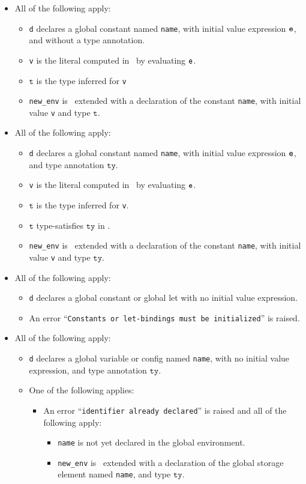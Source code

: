 \documentclass{book}
\newcommand\name[0]{\texttt{name}}
\newcommand\vt[0]{\texttt{t}}
\newcommand\tty[0]{\texttt{ty}}
\begin{document}
\begin{itemize}
  \item All of the following apply:
  \begin{itemize}
    \item \texttt{d} declares a global constant named \name, with initial value expression $\texttt{e}$, and without a type annotation.
    \item \texttt{v} is the literal computed in \tenv\ by evaluating $\texttt{e}$.
    \item $\vt$ is the type inferred for \texttt{v}
    \item \texttt{new\_env} is \tenv\ extended with a declaration of the constant \name, with initial value \texttt{v} and type $\vt$.
  \end{itemize}

  \item All of the following apply:
  \begin{itemize}
    \item \texttt{d} declares a global constant named \name, with initial value expression $\texttt{e}$, and type annotation $\tty$.
    \item \texttt{v} is the literal computed in \tenv\ by evaluating $\texttt{e}$.
    \item $\vt$ is the type inferred for \texttt{v}.
    \item $\vt$ type-satisfies $\tty$ in \tenv.
    \item \texttt{new\_env} is \tenv\ extended with a declaration of the constant \name, with initial value \texttt{v} and type $\tty$.
  \end{itemize}

  \item All of the following apply:
  \begin{itemize}
    \item \texttt{d} declares a global constant or global let with no initial value expression.
    \item An error ``\texttt{Constants or let-bindings must be initialized}'' is raised.
  \end{itemize}

  \item All of the following apply:
  \begin{itemize}
    \item \texttt{d} declares a global variable or config named \name, with no initial value expression, and type annotation $\tty$.
    \item One of the following applies:
    \begin{itemize}
      \item An error ``\texttt{identifier already declared}'' is raised and all of the following apply:
      \begin{itemize}
        \item \texttt{name} is not yet declared in the global environment.
        \item \texttt{new\_env} is \tenv\ extended with a declaration of the global storage element named \name, and type $\tty$.
      \end{itemize}
    \end{itemize}
  \end{itemize}


\end{itemize}
\end{document}
